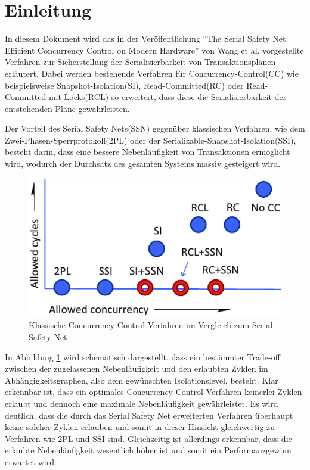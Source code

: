 \section{Einleitung}

In diesem Dokument wird das in der Veröffentlichung \enquote{The Serial Safety Net: Efficient Concurrency Control on Modern Hardware} von Wang et al. \cite{Wang:2015} vorgestellte Verfahren zur Sicherstellung der Serialisierbarkeit von Transaktionsplänen erläutert.
Dabei werden bestehende Verfahren für Concurrency-Control(CC) wie beispielsweise Snapshot-Isolation(SI), Read-Committed(RC) oder Read-Committed mit Locks(RCL) so erweitert, dass diese die Serialisierbarkeit der entstehenden Pläne gewährleisten.

Der Vorteil des Serial Safety Nets(SSN) gegenüber klassischen Verfahren, wie dem Zwei-Phasen-Sperrprotokoll(2PL) oder der Serializable-Snapshot-Isolation(SSI), besteht darin, dass eine bessere Nebenläufigkeit von Transaktionen ermöglicht wird, wodurch der Durchsatz des gesamten Systems massiv gesteigert wird.

\begin{figure}
	\includegraphics{img/Figure_1_komplett.pdf}
	\caption{Klassische Concurrency-Control-Verfahren im Vergleich zum Serial Safety Net}
	\label{fig:trade_off}
\end{figure}

In Abbildung \ref{fig:trade_off} wird schematisch dargestellt, dass ein bestimmter Trade-off zwischen der zugelassenen Nebenläufigkeit und den erlaubten Zyklen im Abhängigkeitsgraphen, also dem gewünschten Isolationslevel, besteht.
Klar erkennbar ist, dass ein optimales Concurrency-Control-Verfahren keinerlei Zyklen erlaubt und dennoch eine maximale Nebenläufigkeit gewährleistet.
Es wird deutlich, dass die durch das Serial Safety Net erweiterten Verfahren überhaupt keine solcher Zyklen erlauben und somit in dieser Hinsicht gleichwertig zu Verfahren wie 2PL und SSI sind.
Gleichzeitig ist allerdings erkennbar, dass die erlaubte Nebenläufigkeit wesentlich höher ist und somit ein Performanzgewinn erwartet wird.

